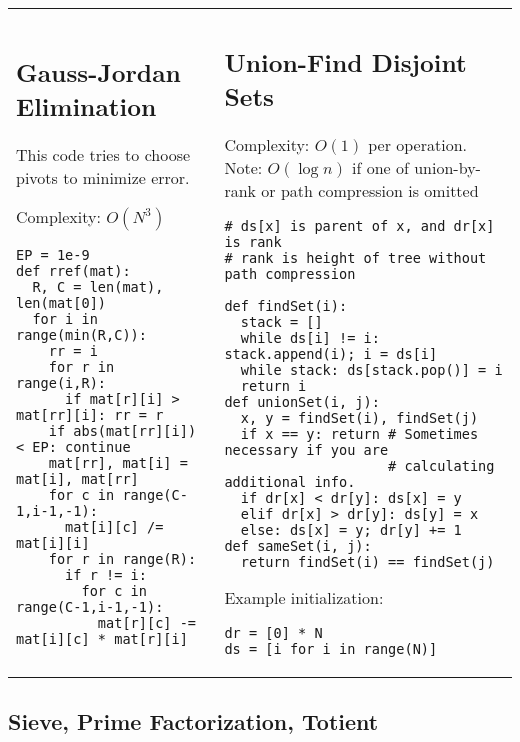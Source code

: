\documentclass[letterpaper]{article}
\begin{document}
\begin{tabular}{@{}p{9cm}p{9cm}@{}}
    \subsection{Gauss-Jordan Elimination}

    This code tries to choose pivots to minimize error.

    Complexity: $O\left(N^3\right)$

    \begin{lstlisting}
EP = 1e-9
def rref(mat):
  R, C = len(mat), len(mat[0])
  for i in range(min(R,C)):
    rr = i
    for r in range(i,R):
      if mat[r][i] > mat[rr][i]: rr = r
    if abs(mat[rr][i]) < EP: continue
    mat[rr], mat[i] = mat[i], mat[rr]
    for c in range(C-1,i-1,-1):
      mat[i][c] /= mat[i][i]
    for r in range(R):
      if r != i:
        for c in range(C-1,i-1,-1):
          mat[r][c] -= mat[i][c] * mat[r][i]
\end{lstlisting}
     &
    \subsection{Union-Find Disjoint Sets}

    Complexity: $O\left(1\right)$ per operation. Note: $O\left(\log n\right)$ if one of union-by-rank or path compression is omitted

    \begin{lstlisting}
# ds[x] is parent of x, and dr[x] is rank
# rank is height of tree without path compression

def findSet(i):
  stack = []
  while ds[i] != i: stack.append(i); i = ds[i]
  while stack: ds[stack.pop()] = i
  return i
def unionSet(i, j):
  x, y = findSet(i), findSet(j)
  if x == y: return # Sometimes necessary if you are
                    # calculating additional info.
  if dr[x] < dr[y]: ds[x] = y
  elif dr[x] > dr[y]: ds[y] = x
  else: ds[x] = y; dr[y] += 1
def sameSet(i, j):
  return findSet(i) == findSet(j)
\end{lstlisting}

    Example initialization:

    \begin{lstlisting}
dr = [0] * N
ds = [i for i in range(N)]
\end{lstlisting}
\end{tabular}

\clearpage
\subsection{Sieve, Prime Factorization, Totient}
\end{document}
